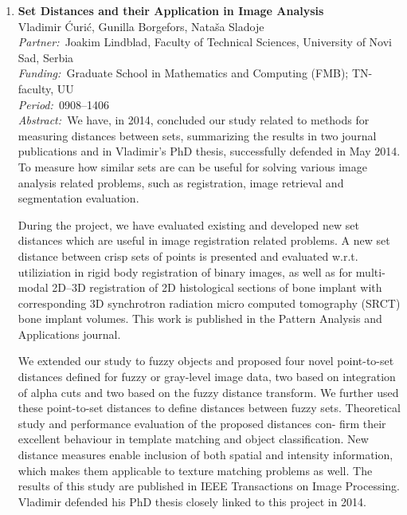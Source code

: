 \documentclass[10pt, a4paper]{article}
\newcommand{\aabstract}[1]{\emph{Abstract:~}#1}
\newcommand{\ffunding}[1]{\emph{Funding:~}#1\\}
\newcommand{\ppartner}[1]{\emph{Partner:~}#1\\}
\newcommand{\pperiod}[1]{\emph{Period:~}#1\\}
\begin{document}
{\begin{enumerate}

\item
\label{proj:set_dist}
\textbf{Set Distances and their Application in Image Analysis}\\
Vladimir \' Curi\' c, Gunilla Borgefors, Nata\v sa Sladoje\\
\ppartner{Joakim Lindblad, Faculty of Technical Sciences, University of Novi Sad, Serbia}
\ffunding{Graduate School in Mathematics and Computing (FMB); TN-faculty, UU}
\pperiod{0908--1406}
\aabstract{We have, in 2014, concluded our study related to methods for
measuring distances between sets, summarizing the results in two journal
publications and in Vladimir's PhD thesis, successfully defended in May
2014. To measure how similar sets are can be useful for solving various
image analysis related problems, such as registration, image retrieval and
segmentation evaluation.

During the project, we have evaluated existing and developed new set distances
which are useful in image registration related problems. A new set
distance between crisp sets of points is presented and evaluated w.r.t. utiliziation
in rigid body registration of binary images, as well as for multi-modal
2D--3D registration of 2D histological sections of bone implant with corresponding
3D synchrotron radiation micro computed tomography (SR\textmu CT) bone implant volumes. This work is published in the Pattern Analysis and Applications journal.

We extended our study to fuzzy objects and proposed four novel point-to-set
distances defined for fuzzy or gray-level image data, two based on integration
of alpha cuts and two based on the fuzzy distance transform. We further
used these point-to-set distances to define distances between fuzzy sets.
Theoretical study and performance evaluation of the proposed distances con-
firm their excellent behaviour in template matching and object classification.
New distance measures enable inclusion of both spatial and intensity information,
which makes them applicable to texture matching problems as well. The results of this study are published in IEEE Transactions on Image Processing. Vladimir defended his PhD thesis closely linked to this project in 2014.}



\end{enumerate}}
\end{document}

